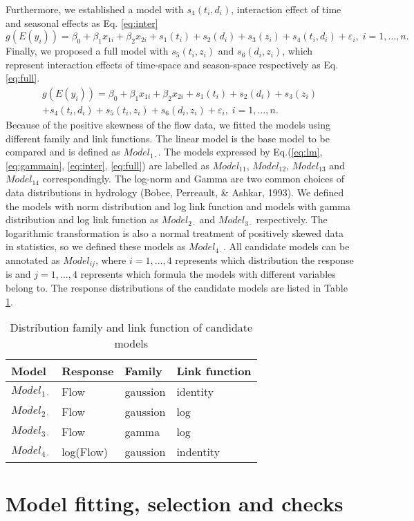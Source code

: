 \documentclass[12pt,oneside]{reedthesis}
\begin{document}
Furthermore, we established a model with \(s_4(t_i,d_i)\), interaction effect of time and seasonal effects as Eq. \ref{eq:inter}
\begin{equation}
g(E(y_i)) =\beta_0+\beta_1 x_{1i}+\beta_2 x_{2i} +s_1(t_i) + s_2(d_i) + s_3(z_i)+s_4(t_i,d_i)+\varepsilon_i,\;i=1,\dots,n. \label{eq:inter}
\end{equation}
Finally, we proposed a full model with \(s_5(t_i,z_i)\) and \(s_6(d_i,z_i)\), which represent interaction effects of time-space and season-space respectively as Eq. \ref{eq:full}.
\begin{equation}
  \begin{array}{l}
g(E(y_i)) = \beta_0+\beta_1x_{1i}+\beta_2x_{2i} +s_1(t_i) + s_2(d_i) + s_3(z_i)\\+s_4(t_i,d_i)+s_5(t_i,z_i) +s_6(d_i,z_i)+ \varepsilon_i,\;i=1,\dots,n. \label{eq:full}
  \end{array}
\end{equation}
Because of the positive skewness of the flow data, we fitted the models using different family and link functions. The linear model is the base model to be compared and is defined as \(Model_{1\cdot}\). The models expressed by Eq.(\ref{eq:lm}, \ref{eq:gammain}, \ref{eq:inter}, \ref{eq:full}) are labelled as \(Model_{11}\), \(Model_{12}\), \(Model_{13}\) and \(Model_{14}\) correspondingly. The log-norm and Gamma are two common choices of data distributions in hydrology (Bobee, Perreault, \& Ashkar, 1993). We defined the models with norm distribution and log link function and models with gamma distribution and log link function as \(Model_{2\cdot}\) and \(Model_{3\cdot}\) respectively. The logarithmic transformation is also a normal treatment of positively skewed data in statistics, so we defined these models as \(Model_{4\cdot}\). All candidate models can be annotated as \(Model_{ij}\), where \(i=1,\dots,4\) represents which distribution the response is and \(j=1,\dots,4\) represents which formula the models with different variables belong to. The response distributions of the candidate models are listed in Table \ref{tab:model}.
\begin{table}[!h]

\caption{\label{tab:unnamed-chunk-8}\label{tab:model} Distribution family and link function of candidate models}
\centering
\fontsize{10}{12}\selectfont
\begin{tabular}[t]{llll}
\toprule
Model & Response & Family & Link function\\
\midrule
$Model_{1{\cdot}}$ & Flow & gaussion & identity\\
$Model_{2{\cdot}}$ & Flow & gaussion & log\\
$Model_{3{\cdot}}$ & Flow & gamma & log\\
$Model_{4{\cdot}}$ & log(Flow) & gaussion & indentity\\
\bottomrule
\end{tabular}
\end{table}
\hypertarget{model-fitting-selection-and-checks}{%
\section{Model fitting, selection and checks}\label{model-fitting-selection-and-checks}}
\end{document}
